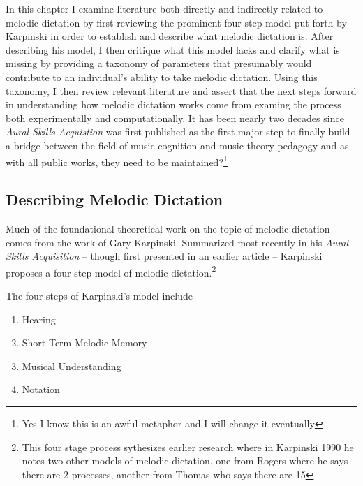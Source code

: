 \documentclass[]{book}
\providecommand{\tightlist}{%
  \setlength{\itemsep}{0pt}\setlength{\parskip}{0pt}}
\let\rmarkdownfootnote\footnote%
\def\footnote{\protect\rmarkdownfootnote}
\begin{document}
In this chapter I examine literature both directly and indirectly related to melodic dictation by first reviewing the prominent four step model put forth by Karpinski in order to establish and describe what melodic dictation is.
After describing his model, I then critique what this model lacks and clarify what is missing by providing a taxonomy of parameters that presumably would contribute to an individual's ability to take melodic dictation.
Using this taxonomy, I then review relevant literature and assert that the next steps forward in understanding how melodic dictation works come from examing the process both experimentally and computationally.
It has been nearly two decades since \emph{Aural Skills Acquistion} was first published as the first major step to finally build a bridge between the field of music cognition and music theory pedagogy \citep{davidbutlerWhyGulfMusic1997a, karpinskiAuralSkillsAcquisition2000, klonoskiPerceptualLearningHierarchy2000} and as with all public works, they need to be maintained?\footnote{Yes I know this is an awful metaphor and I will change it eventually}

\hypertarget{describing-melodic-dictation}{%
\subsection{Describing Melodic Dictation}\label{describing-melodic-dictation}}

Much of the foundational theoretical work on the topic of melodic dictation comes from the work of Gary Karpinski.
Summarized most recently in his \emph{Aural Skills Acquisition} \citep{karpinskiAuralSkillsAcquisition2000}-- though first presented in an earlier article \citep{karpinskiModelMusicPerception1990}-- Karpinski proposes a four-step model of melodic dictation.\footnote{This four stage process sythesizes earlier research where in Karpinski 1990 he notes two other models of melodic dictation, one from Rogers where he says there are 2 processes, another from Thomas who says there are 15}

The four steps of Karpinski's model include

\begin{enumerate}
\def\labelenumi{\arabic{enumi}.}
\tightlist
\item
  Hearing
\item
  Short Term Melodic Memory
\item
  Musical Understanding
\item
  Notation
\end{enumerate}
\end{document}
